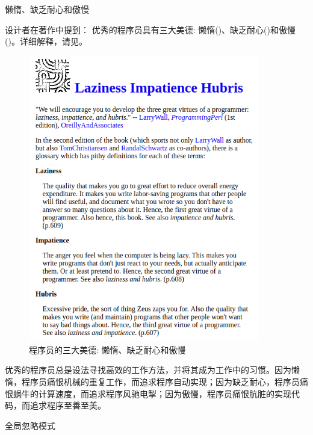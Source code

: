 \begin{content}
\begin{episode}{懒惰、缺乏耐心和傲慢}
\begin{content}

设计者在著作中提到：
优秀的程序员具有三大美德: 懒惰()、缺乏耐心()和傲慢()。详细解释，请见。

\begin{figure}[H]
\centering
\includegraphics[width=0.9\textwidth]{figures/xunit/larry-wall.png}
\caption{程序员的三大美德: 懒惰、缺乏耐心和傲慢}
 \label{fig:larry-wall}
\end{figure}

优秀的程序员总是设法寻找高效的工作方法，并将其成为工作中的习惯。因为懒惰，程序员痛恨机械的重复工作，而追求程序自动实现；因为缺乏耐心，程序员痛恨蜗牛的计算速度，而追求程序风驰电掣；因为傲慢，程序员痛恨肮脏的实现代码，而追求程序至善至美。

\end{content}
\end{episode}

\begin{episode}{全局忽略模式}
\begin{content}


\end{content}
\end{episode}
\end{content}
